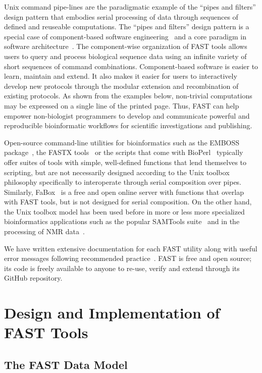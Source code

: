 \documentclass{frontiersSCNS} %
\begin{document}
Unix command pipe-lines are the paradigmatic example of the ``pipes
and filters'' design pattern that embodies serial processing of data
through sequences of defined and reuseable computations. The ``pipes
and filters'' design pattern is a special case of component-based
software engineering~\citep{mcilroy_mass-produced_1969} and a core
paradigm in software
architecture~\citep{garlan_introduction_1994}. The component-wise
organization of FAST tools allows users to query and process
biological sequence data using an infinite variety of short sequences
of command combinations. Component-based software is easier to learn,
maintain and extend. It also makes it easier for users to interactively develop
new protocols through the modular extension and recombination of
existing protocols. As shown from the examples below, non-trivial
computations may be expressed on a single line of the printed
page. Thus, FAST can help empower non-biologist programmers to
develop and communicate powerful and reproducible bioinformatic
workflows for scientific investigations and publishing.

Open-source command-line utilities for bioinformatics such as the
EMBOSS package~\citep{Rice2000}, the FASTX tools~\citep{fastx} or the
scripts that come with BioPerl~\citep{Stajich2002} typically offer
suites of tools with simple, well-defined functions that lend
themselves to scripting, but are not necessarily designed according to
the Unix toolbox philosophy specifically to interoperate through
serial composition over pipes. Similarly, FaBox~\citep{MEN:MEN1821} is
a free and open online server with functions that overlap with FAST
tools, but is not designed for serial composition. On the other hand,
the Unix toolbox model has been used before in more or less more
specialized bioinformatics applications such as the popular SAMTools
suite~\citep{Li15082009} and in the processing of NMR
data~\citep{delaglio1995nmrpipe}.

We have written extensive documentation for each FAST utility along
with useful error messages following recommended
practice~\citep{Seemann2013}. FAST is free and open source; its code
is freely available to anyone to re-use, verify and extend through its
GitHub repository.

\section{Design and Implementation of FAST Tools}
\subsection{The FAST Data Model}
\end{document}

